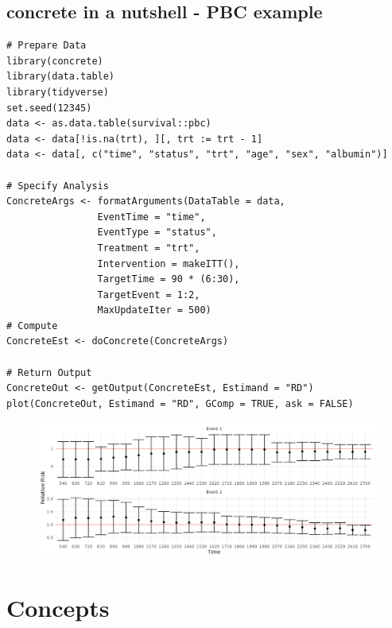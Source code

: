 \documentclass{report}
\newcommand{\1}{\ensuremath{\mathbf{1}}}
\begin{document}
\subsection{concrete in a nutshell - PBC example}
\label{sec:org68daf60}
\begin{lstlisting}
# Prepare Data
library(concrete)
library(data.table)
library(tidyverse)
set.seed(12345)
data <- as.data.table(survival::pbc)
data <- data[!is.na(trt), ][, trt := trt - 1]
data <- data[, c("time", "status", "trt", "age", "sex", "albumin")]

# Specify Analysis
ConcreteArgs <- formatArguments(DataTable = data,
				EventTime = "time",
				EventType = "status",
				Treatment = "trt",
				Intervention = makeITT(),
				TargetTime = 90 * (6:30),
				TargetEvent = 1:2,
				MaxUpdateIter = 500)
# Compute
ConcreteEst <- doConcrete(ConcreteArgs)

# Return Output
ConcreteOut <- getOutput(ConcreteEst, Estimand = "RD")
plot(ConcreteOut, Estimand = "RD", GComp = TRUE, ask = FALSE)
\end{lstlisting}

\begin{figure}[H]
\center
\includegraphics[width=\linewidth]{fig/RR.png}
\end{figure}

\section{Concepts}
\label{concepts}
\end{document}
